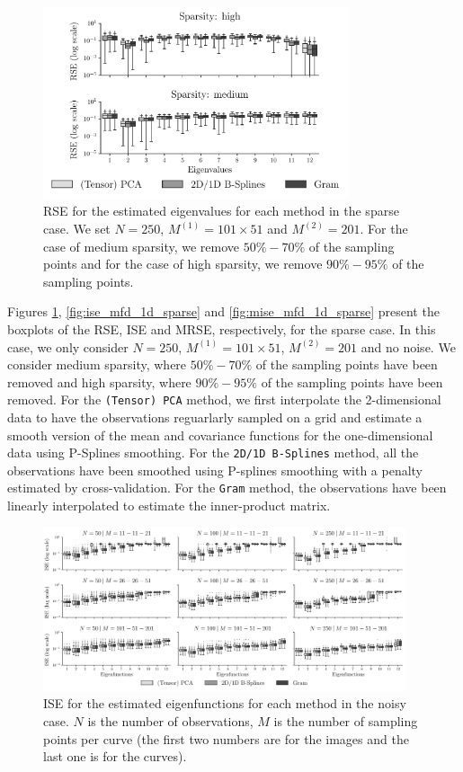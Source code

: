 \begin{figure}
    \centering
    \includegraphics[width=0.8\textwidth]{figures/AE_sparse}
    \caption{RSE for the estimated eigenvalues for each method in the sparse case. We set $N = 250$, $M^{(1)} = 101 \times 51$ and $M^{(2)} = 201$. For the case of medium sparsity, we remove $50\%-70\%$ of the sampling points and for the case of high sparsity, we remove $90\%-95\%$ of the sampling points.}
    \label{fig:logAE_mfd_1d_sparse}
\end{figure}


Figures \ref{fig:logAE_mfd_1d_sparse}, \ref{fig:ise_mfd_1d_sparse} and \ref{fig:mise_mfd_1d_sparse} present the boxplots of the RSE, ISE and MRSE, respectively, for the sparse case. In this case, we only consider $N = 250$, $M^{(1)} = 101 \times 51$, $M^{(2)} = 201$ and no noise. We consider medium sparsity, where $50\%-70\%$ of the sampling points have been removed and high sparsity, where $90\%-95\%$ of the sampling points have been removed. For the \texttt{(Tensor) PCA} method, we first interpolate the 2-dimensional data to have the observations reguarlarly sampled on a grid and estimate a smooth version of the mean and covariance functions for the one-dimensional data using P-Splines smoothing. For the \texttt{2D/1D B-Splines} method, all the observations have been smoothed using P-splines smoothing with a penalty estimated by cross-validation. For the \texttt{Gram} method, the observations have been linearly interpolated to estimate the inner-product matrix.



\begin{figure}
     \centering
    \includegraphics[width=0.95\textwidth]{figures/ISE_noise}
    \caption{ISE for the estimated eigenfunctions for each method in the noisy case. $N$ is the number of observations, $M$ is the number of sampling points per curve (the first two numbers are for the images and the last one is for the curves).}
    \label{fig:ise_mfd_1d_noise}
\end{figure}


